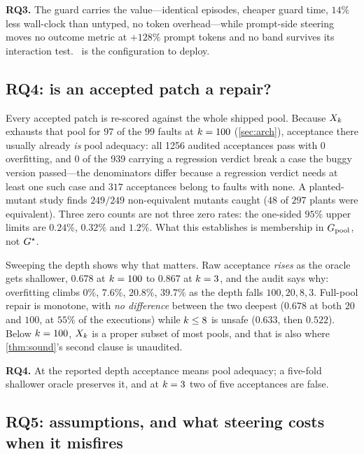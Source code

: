 \textbf{RQ3.} The guard carries the value---identical episodes, cheaper guard
time, $14\%$ less wall-clock than untyped, no token overhead---while prompt-side
steering moves no outcome metric at $+128\%$ prompt tokens and no band survives
its interaction test. \armguard\ is the configuration to deploy.

\subsection{RQ4: is an accepted patch a repair?}
\label{sec:results-depth}

Every accepted patch is re-scored against the whole shipped pool. Because $X_{k}$
exhausts that pool for $97$ of the $99$ faults at $k = 100$
(\cref{sec:arch}), acceptance there usually already \emph{is} pool adequacy:
all \num{1256} audited acceptances pass with $0$ overfitting, and $0$ of the
\num{939} carrying a regression verdict break a
case the buggy version passed---the denominators differ because a regression
verdict needs at least one such case and $317$ acceptances belong to faults
with none. A planted-mutant study finds $249/249$ non-equivalent mutants caught
($48$ of $297$ plants were equivalent). Three zero counts are not three zero
rates: the one-sided $95\%$ upper limits are $0.24\%$, $0.32\%$ and $1.2\%$.
What this establishes is membership in $G_{\mathrm{pool}}$, not $G^{\star}$.

Sweeping the depth shows why that matters. Raw acceptance \emph{rises} as the
oracle gets shallower, $0.678$ at $k = 100$ to $0.867$ at
$k = 3$, and the audit says why: overfitting climbs $0\%$, $7.6\%$,
$20.8\%$, $39.7\%$ as the depth falls $100, 20, 8, 3$. Full-pool repair is
monotone, with \emph{no difference} between the two deepest ($0.678$ at both
$20$ and $100$, at $55\%$ of the executions) while $k \le 8$ is
unsafe ($0.633$, then $0.522$). Below $k = 100$, $X_{k}$ is a proper
subset of most pools, and that is also where \cref{thm:sound}'s second clause
is unaudited.

\textbf{RQ4.} At the reported depth acceptance means pool adequacy; a five-fold
shallower oracle preserves it, and at $k = 3$ two of five
acceptances are false.

\subsection{RQ5: assumptions, and what steering costs when it misfires}
\label{sec:results-assumptions}

